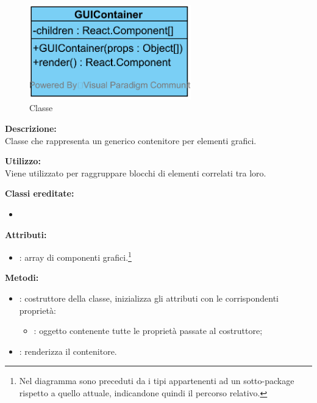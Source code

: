 \paragraph[::GUIContainer]{\class}\mbox{}\\ \label{\class}
\begin{figure}[H]
	\centering
	\includegraphics[width=7cm]{./diagrammi/framework/view/guicontainer.png}
	\caption{Classe \class}
\end{figure}
\textbf{Descrizione:}\\
Classe che rappresenta un generico contenitore per elementi grafici.

\textbf{Utilizzo:}\\
Viene utilizzato per raggruppare blocchi di elementi correlati tra loro.

\textbf{Classi ereditate:}
\begin{itemize}
	\item {}
\end{itemize}


\textbf{Attributi:}
\begin{itemize}
	\item {}: array di componenti grafici.\footnote{Nel diagramma sono preceduti da \virgolette{>>} i tipi appartenenti ad un sotto-package rispetto a quello attuale, indicandone quindi il percorso relativo.}
\end{itemize}

\textbf{Metodi:}
\begin{itemize}
	\item {}: costruttore della classe, inizializza gli attributi con le corrispondenti proprietà:
	\begin{itemize}
		\item {}: oggetto contenente tutte le proprietà passate al costruttore;
	\end{itemize}
	\item {}: renderizza il contenitore.
\end{itemize}

